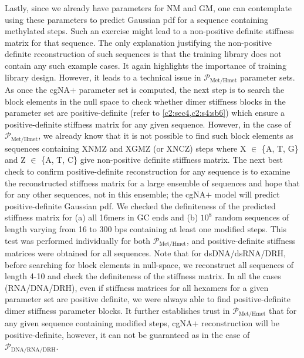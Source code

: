 Lastly, since we already have parameters for NM and GM, one can contemplate using these parameters to predict Gaussian pdf for a sequence containing methylated \gpc steps. 
Such an exercise might lead to a non-positive definite stiffness matrix for that sequence.
The only explanation justifying the non-positive definite reconstruction of such sequences is that the training library does not contain any such example cases.
It again highlights the importance of training library design.
However, it leads to a technical issue in $\mathcal{P}_{\text{Met/Hmet}}$ parameter sets. As once the cgNA$+$ parameter set is computed, the next step is to search the block elements in the null space to check whether dimer stiffness blocks in the parameter set are positive-definite (refer to \cref{c2:sec4,c2:s4:sb6}) which ensure a positive-definite stiffness matrix for any given sequence.
However, in the case of $\mathcal{P}_{\text{Met/Hmet}}$, we already know that it is not possible to find such block elements as sequences containing XNMZ and XGMZ (or XNCZ) steps where X $\in$ \{A, T, G\} and Z $\in$ \{A, T, C\} give non-positive definite stiffness matrix.
The next best check to confirm positive-definite reconstruction for any sequence is to examine the reconstructed stiffness matrix for a large ensemble of sequences and hope that for any other sequences, not in this ensemble; the cgNA$+$ model will predict positive-definite Gaussian pdf.
We checked the definiteness of the predicted stiffness matrix for (a) all 16mers in GC ends and (b) $10^8$ random sequences of length varying from 16 to 300 bps containing at least one modified \cpg steps. 
This test was performed individually for both $\mathcal{P}_{\text{Met/Hmet}}$, and positive-definite stiffness matrices were obtained for all sequences. 
Note that for dsDNA/dsRNA/DRH, before searching for block elements in null-space, we reconstruct all sequences of length 4-10 and check the definiteness of the stiffness matrix. 
In all the cases (RNA/DNA/DRH), even if stiffness matrices for all hexamers for a given parameter set are positive definite, we were always able to find positive-definite dimer stiffness parameter blocks.
It further establishes trust in $\mathcal{P}_{\text{Met/Hmet}}$ that for any given sequence containing modified \cpg steps, cgNA$+$ reconstruction will be positive-definite, however, it can not be guaranteed as in the case of $\mathcal{P}_{\text{DNA/RNA/DRH}}$. 



